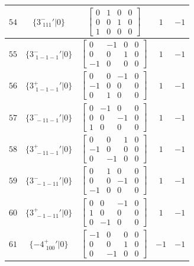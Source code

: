 \documentclass[fleqn,8pt]{jsarticle}
\begin{document}
\begin{longtable}{ccccc}
$ 54 $ & $ \{3^{-}_{\,\,111}{}'|0\} $ & $ \begin{bmatrix} 0 & 1 & 0 & 0 \\ 0 & 0 & 1 & 0 \\ 1 & 0 & 0 & 0 \end{bmatrix} $ & $ 1 $ & $ -1 $ \\ \hline
$ 55 $ & $ \{3^{-}_{\,\,1-1-1}{}'|0\} $ & $ \begin{bmatrix} 0 & -1 & 0 & 0 \\ 0 & 0 & 1 & 0 \\ -1 & 0 & 0 & 0 \end{bmatrix} $ & $ 1 $ & $ -1 $ \\ \hline
$ 56 $ & $ \{3^{+}_{\,\,1-1-1}{}'|0\} $ & $ \begin{bmatrix} 0 & 0 & -1 & 0 \\ -1 & 0 & 0 & 0 \\ 0 & 1 & 0 & 0 \end{bmatrix} $ & $ 1 $ & $ -1 $ \\ \hline
$ 57 $ & $ \{3^{-}_{\,\,-11-1}{}'|0\} $ & $ \begin{bmatrix} 0 & -1 & 0 & 0 \\ 0 & 0 & -1 & 0 \\ 1 & 0 & 0 & 0 \end{bmatrix} $ & $ 1 $ & $ -1 $ \\ \hline
$ 58 $ & $ \{3^{+}_{\,\,-11-1}{}'|0\} $ & $ \begin{bmatrix} 0 & 0 & 1 & 0 \\ -1 & 0 & 0 & 0 \\ 0 & -1 & 0 & 0 \end{bmatrix} $ & $ 1 $ & $ -1 $ \\ \hline
$ 59 $ & $ \{3^{-}_{\,\,-1-11}{}'|0\} $ & $ \begin{bmatrix} 0 & 1 & 0 & 0 \\ 0 & 0 & -1 & 0 \\ -1 & 0 & 0 & 0 \end{bmatrix} $ & $ 1 $ & $ -1 $ \\ \hline
$ 60 $ & $ \{3^{+}_{\,\,-1-11}{}'|0\} $ & $ \begin{bmatrix} 0 & 0 & -1 & 0 \\ 1 & 0 & 0 & 0 \\ 0 & -1 & 0 & 0 \end{bmatrix} $ & $ 1 $ & $ -1 $ \\ \hline
$ 61 $ & $ \{-4^{+}_{\,\,100}{}'|0\} $ & $ \begin{bmatrix} -1 & 0 & 0 & 0 \\ 0 & 0 & 1 & 0 \\ 0 & -1 & 0 & 0 \end{bmatrix} $ & $ -1 $ & $ -1 $ \\ \hline

\end{longtable}
\end{document}
